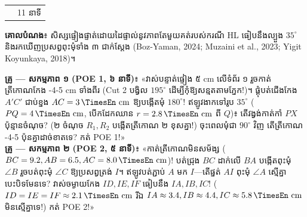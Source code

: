 \documentclass[a4paper,12pt]{article}
\makeatletter
\newcommand{\en}[1]{{\TimesEn #1}}
\newcommand{\enbf}[1]{{\TimesEn\textbf{#1}}}
\newcommand{\unit}[1]{\,\text{\en{#1}}}
\newcommand{\ang}[1]{\ensuremath{\angle #1}}
\newenvironment{phasebox}[3]{%
  \par\Needspace{2.4cm}%
  \begin{tcolorbox}[
    enhanced, sharp corners, colback=headgray, colframe=black,
    boxrule=1.0pt, top=3.5pt, bottom=3.5pt, left=8pt, right=8pt,
    before skip=5pt, after skip=3pt
  ]
    \linespread{1.0}\selectfont\renewcommand{\arraystretch}{1.0}%
    \begin{tabular*}{\linewidth}{@{}>{\raggedright\arraybackslash}p{12.80cm}@{\extracolsep{\fill}}r@{}}
      {\muol\fontsize{11pt}{14.5pt}\selectfont #1} & {\fontsize{10.5pt}{13.5pt}\selectfont\en{#2 |} #3}%
    \end{tabular*}%
  \end{tcolorbox}%
  \begingroup\fontsize{11.5pt}{14.92pt}\selectfont
}{%
  \par\endgroup
  \vspace{3pt}{\color{black}\hrule height 0.75pt}\vspace{5pt}%
}
\makeatother
\begin{document}
\begin{phasebox}{ជំហាន ៣ក \enbf{(E2)}៖ បត់ក្រដាស ១\enbf{:}១ \enbf{POE 1 (6') \& POE 2 (5')}}{11--22 min}{11 នាទី}
\textbf{គោលបំណង}៖ សិស្សផ្ទៀងផ្ទាត់ដោយដៃផ្ទាល់នូវភាពតែមួយគត់របស់ករណី \en{HL} ធៀបនឹងល្បួង $35^\circ$ និងរកឃើញប្រសព្វពុះមុំទាំង ៣ ជាក់ស្ដែង \en{(Boz-Yaman, 2024; Muzaini et al., 2023; Yigit Koyunkaya, 2018)}។
\begin{scriptbox}
  \textbf{គ្រូ — សកម្មភាព ១ (\en{POE 1}, ៦ នាទី)}៖ «វាស់បន្ទាត់ផ្ទៀង ៥ \en{cm} លើទំព័រ ១ រួចកាត់ត្រីកោណកែង \en{3-4-5 cm} ទាំងពីរ (\en{Cut 2} បង្វិល $195^\circ$ ដើម្បីកុំឱ្យសន្មតតាមភ្នែក!)។ ផ្គុំបត់ជើងកែង $A'C'$ ជាប់ខ្នង $AC=3\unit{cm}$ ឱ្យបង្កើតមុំ $180^\circ$! ឥឡូវងាកទៅរូប $35^\circ$ ($PQ=4\unit{cm}$, បើកដែកឈាន $r=2.8\unit{cm}$ ពី $Q$)៖ តើវង្វង់កាត់កាំ $PX$ ប៉ុន្មានចំណុច? (២ ចំណុច $R_1, R_2$ បង្កើតត្រីកោណ ២ ខុសគ្នា!) ចុះពេលមុំជា $90^\circ$ វិញ តើត្រីកោណ \en{3-4-5} ប៉ុនគ្នាដាច់ខាតទេ? កត់ \en{POE 1}!»\\[2pt]
  \textbf{គ្រូ — សកម្មភាព ២ (\en{POE 2}, ៥ នាទី)}៖ «កាត់ត្រីកោណមិនសម័ង្ស ($BC=9.2, AB=6.5, AC=8.0\unit{cm}$)! បត់ជ្រុង $BC$ ដាក់លើ $BA$ បង្កើតពុះមុំ $\ang{B}$ រួចបត់ពុះមុំ $\ang{C}$ ឱ្យប្រសព្វត្រង់ $I$។ ឥឡូវបត់ភ្ជាប់ $A$ មក $I$—តើផ្នត់ $AI$ ពុះមុំ $\ang{A}$ ស្មើគ្នាបេះបិទមែនទេ? វាស់ចម្ងាយកែង $ID, IE, IF$ ធៀបនឹង $IA, IB, IC$! ($ID=IE=IF \approx 2.1\unit{cm}$ រីឯ $IA \approx 3.4, IB \approx 4.4, IC \approx 5.8\unit{cm}$ មិនស្មើគ្នាទេ!) កត់ \en{POE 2}!»
\end{scriptbox}
\end{phasebox}
\end{document}
